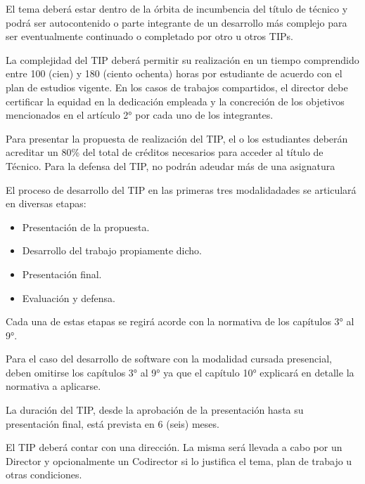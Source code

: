 El tema deberá estar dentro de la órbita de incumbencia del título de técnico y
podrá ser autocontenido o parte integrante de un desarrollo más complejo para ser
eventualmente continuado o completado por otro u otros TIPs.

\articulo La complejidad del TIP deberá permitir su realización en un
tiempo comprendido entre 100 (cien) y 180 (ciento ochenta) horas por estudiante de
acuerdo con el plan de estudios vigente. En los casos de trabajos compartidos, el
director debe certificar la equidad en la dedicación empleada y la concreción de los
objetivos mencionados en el artículo 2° por cada uno de los
integrantes. %

\articulo Para presentar la propuesta de realización del TIP, el o los
estudiantes deberán acreditar un 80\% del total de créditos necesarios para
acceder al título de Técnico. Para la defensa del TIP, no podrán adeudar más de
una asignatura

\articulo El proceso de desarrollo del TIP en las primeras tres modalidadades se articulará en diversas etapas:
\begin{itemize}
 \item Presentación de la propuesta.
 \item Desarrollo del trabajo propiamente dicho.
 \item Presentación final.
 \item Evaluación y defensa.
\end{itemize}

Cada una de estas etapas se regirá acorde con la normativa de los capítulos 3° al 9°.

Para el caso del desarrollo de software con la modalidad cursada presencial, deben omitirse los 
capítulos 3° al 9° ya que el capítulo 10° explicará en detalle la normativa a aplicarse.

\articulo La duración del TIP, desde la aprobación de la presentación hasta
su presentación final, está prevista en 6 (seis) meses. 



\articulo El TIP deberá contar con una dirección. La misma será llevada a
cabo por un Director y opcionalmente un Codirector si lo justifica el tema, plan de
trabajo u otras condiciones.

